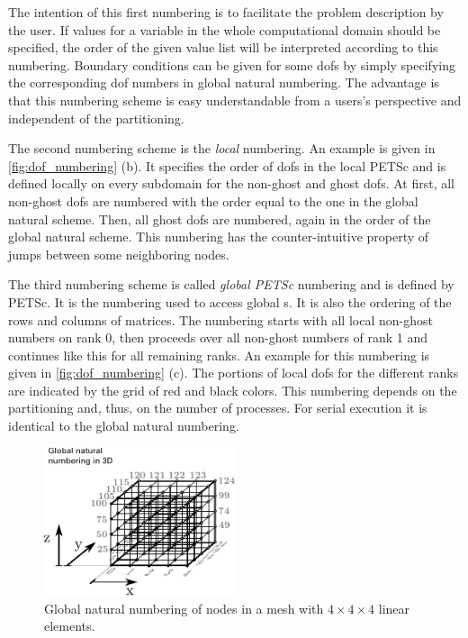 The intention of this first numbering is to facilitate the problem description by the user. If values for a variable in the whole computational domain should be specified, the order of the given value list will be interpreted according to this numbering. Boundary conditions can be given for some dofs by simply specifying the corresponding dof numbers in global natural numbering. The advantage is that this numbering scheme is easy understandable from a users's perspective and independent of the partitioning.

The second numbering scheme is the \emph{local} numbering. An example is given in \cref{fig:dof_numbering} (b). It specifies the order of dofs in the local PETSc \Vec{} and is defined locally on every subdomain for the non-ghost and ghost dofs. At first, all non-ghost dofs are numbered with the order equal to the one in the global natural scheme. Then, all ghost dofs are numbered, again in the order of the global natural scheme. This numbering has the counter-intuitive property of jumps between some neighboring nodes.

The third numbering scheme is called \emph{global PETSc} numbering and is defined by PETSc. It is the numbering used to access global \Vec{}s. It is also the ordering of the rows and columns of matrices. The numbering starts with all local non-ghost numbers on rank 0, then proceeds over all non-ghost numbers of rank 1 and continues like this for all remaining ranks. An example for this numbering is given in \cref{fig:dof_numbering} (c). The portions of local dofs for the different ranks are indicated by the grid of red and black colors. This numbering depends on the partitioning and, thus, on the number of processes. For serial execution it is identical to the global natural numbering.

\begin{figure}%
  \centering%
  \includegraphics[width=0.5\textwidth]{images/implementation/dof_numbering_global_3D.pdf}%
  \caption{Global natural numbering of nodes in a mesh with $4 \times 4 \times 4$ linear elements.}%
  \label{fig:dof_numbering_global_3D}%
\end{figure}%

